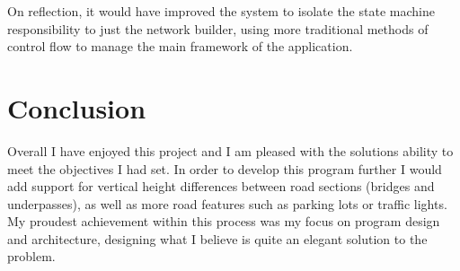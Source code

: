         On reflection, it would have improved the system to isolate the state machine responsibility to just the network builder, using more traditional methods of control flow to manage the main framework of the application.

\section{Conclusion}

    Overall I have enjoyed this project and I am pleased with the solutions ability to meet the objectives I had set. In order to develop this program further I would add support for vertical height differences between road sections (bridges and underpasses), as well as more road features such as parking lots or traffic lights. My proudest achievement within this process was my focus on program design and architecture, designing what I believe is quite an elegant solution to the problem.
